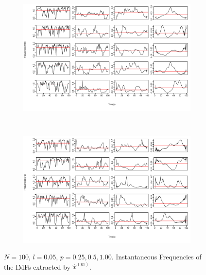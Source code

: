 \documentclass[11pt, a4paper]{article} %
\begin{document}
\begin{figure}
\begin{subfigure}{1.1\textwidth}
  \centering
  \includegraphics[width=\linewidth]{IF_N100_l005_m_1_5.pdf}
  \label{fig:sfig1}
\end{subfigure}\\
\begin{subfigure}{1.1\textwidth}
  \centering
  \includegraphics[width=\linewidth]{IF_N100_l005_m_6_10.pdf}
  \label{fig:sfig2}
\end{subfigure}
\label{fig1}
\caption{$N = 100$, $l = 0.05$, $p = 0.25, 0.5, 1.00$. Instantaneous Frequencies of the IMFs extracted by $\hat{x}^{(m)}$.}
\end{figure}

\restoregeometry


\end{document}
